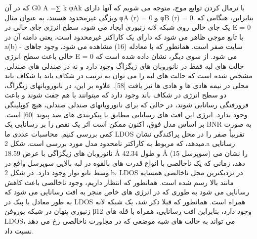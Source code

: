 که در آن G0 A =∑ k φAk با نرمال کردن توابع موج، متوجه می شویم که آنها دارای ویژگی غیرمحدود هستند، به عنوان مثال φA (r) = 0 و φB (r) = 0. بنابراین، هنگامی که یک جای خالی روی شبکه لانه زنبوری ایجاد می شود، سطح انرژی جای خالی در E = 0 با تابع موجی ظاهر می شود که دارای یک کاراکتر غیرمحدود است، یعنی دامنه آن در a(b) - سایت صفر است. همانطور که با معادله (16) مشاهده می شود، وجود جاهای خالی باعث سطح انرژی E = 0 می شود. از سوی دیگر، نشان داده شده است که حالت های لبه فقط در نانوروبان های زیگزاگ وجود دارد و نه در صندلی های صندلی. مشخص شده است که حالت های لبه را می توان به ترتیب در شکاف باند یا شکاف باند محلی در نیمه هادی ها و هادی ها نیز یافت [58]. علاوه بر این، در نانوروبانهای زیگزاگ، دو سطح انرژی در شکاف باند وجود دارد که میتوانند با هم جفت شوند و باعث فرورفتگی رسانایی شوند، در حالی که برای نانوروبانهای صندلی صندلی، هیچ کوپلینگی وجود ندارد. انرژی این افت های رسانایی مطابق با پیکربندی های ضد پیوند [60] است. بر اساس مدل فوق، اکنون ممکن است اثر یک نقص را بر رسانایی یک BNR به صورت کمی بررسی کنیم. محاسبات عددی ما LDOS تقریباً صفر را در محل پراکندگی نشان میدهد، که مربوط به کاراکتر نامحدود مدل مورد بررسی است. شکل 2.a رسانایی نانوروبان های زیگزاگی با عرض 18.59 Å و طول 42.34 Å (15 سوپرسل) را نشان می دهد، زمانی که یک ناخالصی با انواع قدرت های بالقوه در لبه بالایی سوپرسل واقع در وسط نانو نوار وجود دارد. در شکل 2.b، LDOS در نزدیکترین محل ناخالصی همسایه مانند بالا رسم شده است. همانطور که انتظار داریم، وجود ناخالصی باعث کاهش رسانایی می شود به طوری که در انرژی های خاص منجر به افت رسانایی می شود که به طور معادل با پیک در LDOS همراه است. همانطور که قبلا ذکر شد، یک شبکه لانه زنبوری پنهان در شبکه بوروفن β12 وجود دارد، بنابراین افت رسانایی، همراه با قله های LDOS، می تواند به حالت های شبه موضعی که در مجاورت ناخالصی رخ می دهد نسبت داد.
